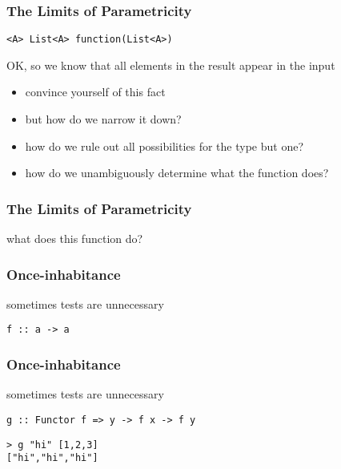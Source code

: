 \begin{frame}[fragile]
\frametitle{The Limits of Parametricity}
\begin{lstlisting}
<A> List<A> function(List<A>)
\end{lstlisting}
OK, so we know that all elements in the result appear in the input
\begin{itemize}
  \item convince yourself of this fact
  \item but how do we narrow it down?
  \item how do we rule out all possibilities for the type but one?
  \item how do we unambiguously determine what the function does?
\end{itemize}
\end{frame}

\begin{frame}[fragile]
\frametitle{The Limits of Parametricity}
\begin{block}{what does this function do?}

\end{block}
\end{frame}

\begin{frame}[fragile]
\frametitle{Once-inhabitance}
\begin{block}{sometimes tests are unnecessary}
\begin{lstlisting}[style=haskell]
f :: a -> a
\end{lstlisting}
\end{block}
\end{frame}

\begin{frame}[fragile]
\frametitle{Once-inhabitance}
\begin{block}{sometimes tests are unnecessary}
\begin{lstlisting}[style=haskell]
g :: Functor f => y -> f x -> f y
\end{lstlisting}
\end{block}
\begin{lstlisting}[style=haskell]
> g "hi" [1,2,3]
["hi","hi","hi"]
\end{lstlisting}
\end{frame}

